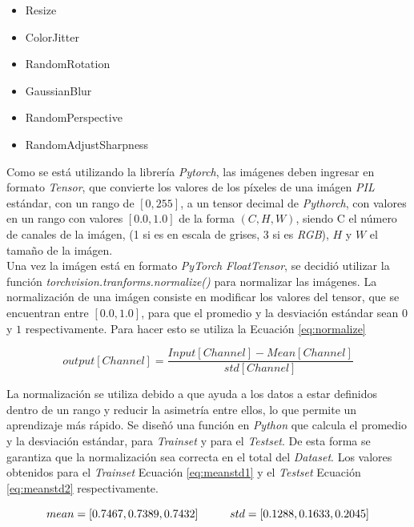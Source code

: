 			\begin{itemize}
				\item Resize
				\item ColorJitter
				\item RandomRotation
				\item GaussianBlur
				\item RandomPerspective
				\item RandomAdjustSharpness
			\end{itemize}

			Como se está utilizando la librería \textit{Pytorch}, las imágenes deben ingresar en formato \textit{Tensor}, que convierte los valores de los píxeles de una imágen \textit{PIL} estándar, con un rango de $[0, 255]$,  a un tensor decimal de \textit{Pythorch}, con valores en un rango con valores $[0.0, 1.0]$ de la forma  $(C, H, W)$, siendo C el número de canales de la imágen, (1 si es en escala de grises, 3 si es \textit{RGB}), $H$ y $W$ el tamaño de la imágen. \\
			
			Una vez la imágen está en formato \textit{PyTorch FloatTensor}, se decidió utilizar la función \textit{torchvision.tranforms.normalize()} para normalizar las imágenes. La normalización de una imágen consiste en modificar los valores del tensor, que se encuentran entre $[0.0, 1.0]$, para que el promedio y la desviación estándar sean $0$ y $1$ respectivamente. Para hacer esto se utiliza la Ecuación \ref{eq:normalize} \cite{Pytorch}
			
			\begin{equation}
				{output[Channel]=\frac{Input[Channel]-Mean[Channel]}{std[Channel]}}
				\label{eq:normalize}
			\end{equation}

			La normalización se utiliza debido a que ayuda a los datos a estar definidos dentro de un rango y reducir la asimetría entre ellos, lo que permite un aprendizaje más rápido. Se diseñó una función en \textit{Python} que calcula el promedio y la desviación estándar, para \textit{Trainset} y para el \textit{Testset}. De esta forma se garantiza que la normalización sea correcta en el total del \textit{Dataset}. Los valores obtenidos para el \textit{Trainset} Ecuación \ref{eq:meanstd1} y el \textit{Testset} Ecuación \ref{eq:meanstd2} respectivamente.
			
			\begin{equation}				{mean = [0.7467, 0.7389, 0.7432] \hspace*{1cm}  std  = [0.1288, 0.1633, 0.2045]}
				\label{eq:meanstd1}
			\end{equation}


